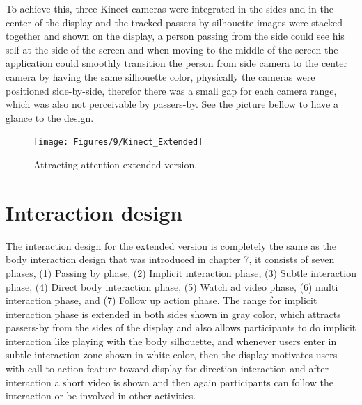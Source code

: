 To achieve this, three Kinect cameras were integrated in the sides and in the center of the display and the tracked passers-by silhouette images were stacked together and shown on the display, a person passing from the side could see his self at the side of the screen and when moving to the middle of the screen the application could smoothly transition the person from side camera to the center camera by having the same silhouette color, physically the cameras were positioned side-by-side, therefor there was a small gap for each camera range, which was also not perceivable by passers-by. See the picture bellow to have a glance to the design. 


\begin{figure}[H]
    \centering
    \texttt{[image: Figures/9/Kinect\_Extended]}
    \caption{Attracting attention extended version.}%
    \label{fig:KinectExtended}%
\end{figure}


\section{Interaction design}
The interaction design for the extended version is completely the same as the body interaction design that was introduced in chapter 7, it consists of seven phases, (1) Passing by phase, (2) Implicit interaction phase, (3) Subtle interaction phase, (4) Direct body interaction phase, (5) Watch ad video phase, (6) multi interaction phase, and (7) Follow up action phase. The range for implicit interaction phase is extended in both sides shown in gray color, which attracts passers-by from the sides of the display and also allows participants to do implicit interaction like playing with the body silhouette, and whenever users enter in subtle interaction zone shown in white color, then the display motivates users with call-to-action feature toward display for direction interaction and after interaction a short video is shown and then again participants can follow the interaction or be involved in other activities.


